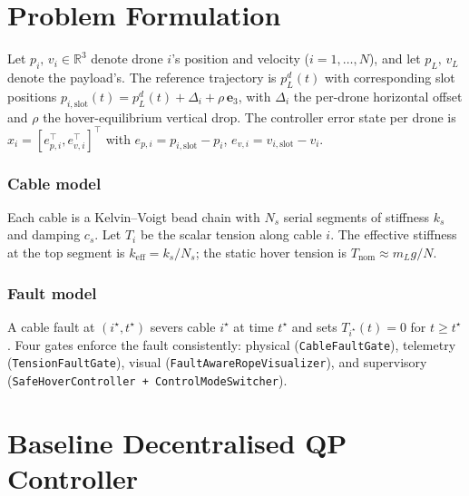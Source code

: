 \documentclass[journal,twocolumn,10pt]{IEEEtran}
\begin{document}
\section{Problem Formulation}
\label{sec:problem}

Let $p_i,\,v_i\in\mathbb R^3$ denote drone $i$'s position and
velocity ($i=1,\dots,N$), and let $p_L,\,v_L$ denote the payload's.
The reference trajectory is $p_L^d(t)$ with corresponding slot
positions $p_{i,\text{slot}}(t) = p_L^d(t) + \Delta_i +
\rho\,\mathbf e_3$, with $\Delta_i$ the per-drone horizontal offset
and $\rho$ the hover-equilibrium vertical drop. The controller
error state per drone is $x_i = [e_{p,i}^\top, e_{v,i}^\top]^\top$
with $e_{p,i} = p_{i,\text{slot}} - p_i$, $e_{v,i} = v_{i,\text{slot}}
- v_i$.

\subsubsection*{Cable model}
Each cable is a Kelvin--Voigt bead chain with $N_s$ serial segments
of stiffness $k_s$ and damping $c_s$. Let $T_i$ be the scalar
tension along cable $i$. The effective stiffness at the top segment
is $k_\text{eff} = k_s / N_s$; the static hover tension is
$T_\text{nom}\approx m_L g / N$.

\subsubsection*{Fault model}
A cable fault at $(i^\star,t^\star)$ severs cable $i^\star$ at time
$t^\star$ and sets $T_{i^\star}(t)=0$ for $t\ge t^\star$. Four
gates enforce the fault consistently: physical (\texttt{CableFaultGate}),
telemetry (\texttt{TensionFaultGate}), visual
(\texttt{FaultAwareRopeVisualizer}), and supervisory
(\texttt{SafeHoverController + ControlModeSwitcher}).

\section{Baseline Decentralised QP Controller}
\label{sec:baseline}
\end{document}
